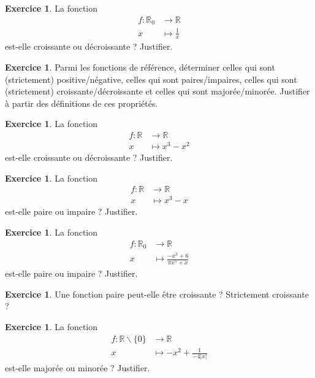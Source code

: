 \documentclass[a4paper,13pt]{scrreprt}
\theoremstyle{plain}
\theoremstyle{definition}
\newtheorem{exo}[subsection]{Exercice}
\newcommand{\rr}{\mathbb{R}}
\begin{document}
\begin{exo} \label{exof11}
	La fonction \begin{align*}
	f : {\rr}_{0} &\to \rr \\
	x &\mapsto \frac{1}{x}
	\end{align*}
	est-elle croissante ou décroissante ? Justifier.
\end{exo}

\begin{exo} \label{exof12}
	Parmi les fonctions de référence, déterminer celles qui sont (strictement) positive/négative, celles qui sont paires/impaires, celles qui sont (strictement) croissante/décroissante et celles qui sont majorée/minorée. Justifier à partir des définitions de ces propriétés.
\end{exo}

\begin{exo} \label{exof13}
	La fonction \begin{align*}
	f : \rr &\to \rr \\
	x &\mapsto x^3 - x^2
	\end{align*}
	est-elle croissante ou décroissante ? Justifier.
\end{exo}

\begin{exo} \label{exof14}
	La fonction \begin{align*}
	f : \rr &\to \rr \\
	x &\mapsto x^3 - x
	\end{align*}
	est-elle paire ou impaire ? Justifier.
\end{exo}

\begin{exo} \label{exof15}
	La fonction \begin{align*}
	f : {\rr}_{0} &\to \rr \\
	x &\mapsto \frac{-x^2+6}{\pi x^5 +x}
	\end{align*}
	est-elle paire ou impaire ? Justifier.
\end{exo}

\begin{exo} \label{exof16}
	Une fonction paire peut-elle être croissante ? Strictement croissante ?
\end{exo}

\begin{exo} \label{exof17}
	La fonction \begin{align*}
	f : {\rr} \backslash \{0\} &\to \rr \\
	x &\mapsto -x^2 + \frac{1}{-4|x|}
	\end{align*}
	est-elle majorée ou minorée ? Justifier.
\end{exo}
\end{document}
